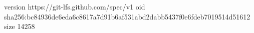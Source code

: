 version https://git-lfs.github.com/spec/v1
oid sha256:bc84936de6eda6c8617a7d91b6af531abd2dabb5437f0e6fdeb7019514d51612
size 14258
